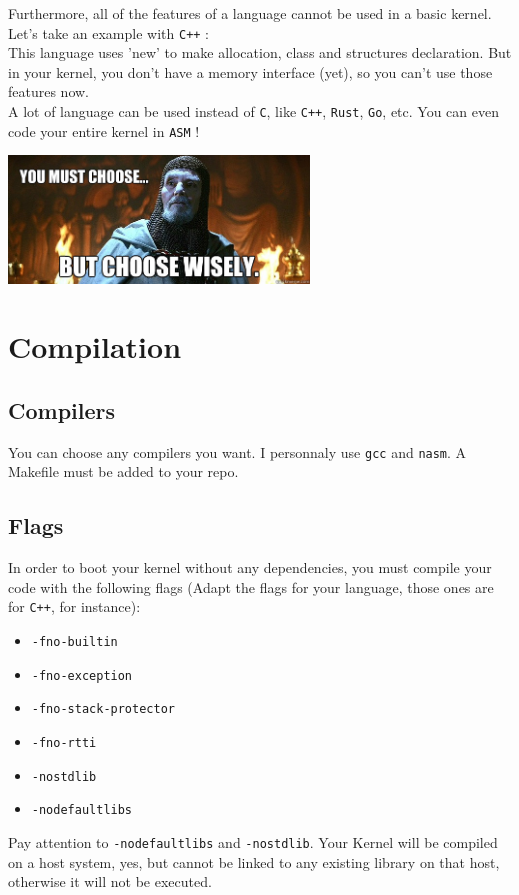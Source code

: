 \documentclass{42-en}
\begin{document}
			Furthermore, all of the features of a language cannot be used in a
			basic kernel. Let's take an example with \texttt{C++} :\\
			This language uses 'new' to make allocation, class and structures
			declaration. But in your kernel, you don't have a memory interface
			(yet), so you can't use those features now.\\

			A lot of language can be used instead of \texttt{C},
			like \texttt{C++}, \texttt{Rust}, \texttt{Go}, etc.
			You can even code your entire kernel in \texttt{ASM} !\\
			\begin{center}
			  \includegraphics[width=8cm]{choose.jpg}
			\end{center}

\newpage

	\section{Compilation}
		\subsection{Compilers}
			You can choose any compilers you want. I personnaly use	\texttt{gcc}
			and \texttt{nasm}. A Makefile must be added to your repo.
		\subsection{Flags}
			In order to boot your kernel without any dependencies, you must compile
			your code with the following flags (Adapt the flags for your language,
			those ones are for \texttt{C++}, for instance):
			\begin{itemize}\itemsep1pt
				\item \texttt{-fno-builtin}
				\item \texttt{-fno-exception}
				\item \texttt{-fno-stack-protector}
				\item \texttt{-fno-rtti}
				\item \texttt{-nostdlib}
				\item \texttt{-nodefaultlibs}
			\end{itemize}
			Pay attention to \texttt{-nodefaultlibs} and \texttt{-nostdlib}.
			Your Kernel will be compiled on a host system, yes, but cannot be
			linked to any existing library on that host, otherwise it will not
			be executed.
\end{document}
